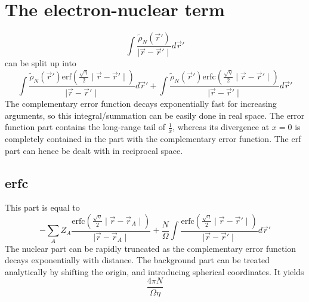 \documentclass[11pt,a4paper]{article}
\begin{document}
\section{The electron-nuclear term}
\begin{equation}
\int \frac{\tilde{\rho}_N(\vec{r}')}{\mid \vec{r} - \vec{r}' \mid} d\vec{r}' \label{gjgj}
\end{equation}
can be split up into
\begin{equation}
\int \frac{\tilde{\rho}_N(\vec{r}') \text{erf}\left( \frac{\sqrt{\eta}}{2} \mid \vec{r} - \vec{r}' \mid \right)}{\mid \vec{r} - \vec{r}' \mid} d\vec{r}' + \int \frac{\tilde{\rho}_N(\vec{r}') \text{erfc}\left( \frac{\sqrt{\eta}}{2} \mid \vec{r} - \vec{r}' \mid \right)}{\mid \vec{r} - \vec{r}' \mid} d\vec{r}'
\end{equation}
The complementary error function decays exponentially fast for increasing arguments, so this integral/summation can be easily done in real space. The error function part contains the long-range tail of $\frac{1}{x}$, whereas its divergence at $x=0$ is completely contained in the part with the complementary error function. The erf part can hence be dealt with in reciprocal space.
\subsection{erfc}
This part is equal to
\begin{equation}
- \sum\limits_A Z_A \frac{\text{erfc}\left( \frac{\sqrt{\eta}}{2} \mid \vec{r} - \vec{r}_A \mid \right)}{\mid \vec{r} - \vec{r}_A \mid} + \frac{N}{\Omega} \int  \frac{\text{erfc}\left( \frac{\sqrt{\eta}}{2} \mid \vec{r} - \vec{r}' \mid \right)}{\mid \vec{r} - \vec{r}' \mid} d\vec{r}'
\end{equation}
The nuclear part can be rapidly truncated as the complementary error function decays exponentially with distance. The background part can be treated analytically by shifting the origin, and introducing spherical coordinates. It yields
\begin{equation}
\frac{4 \pi N}{\Omega \eta}
\end{equation}
\end{document}
